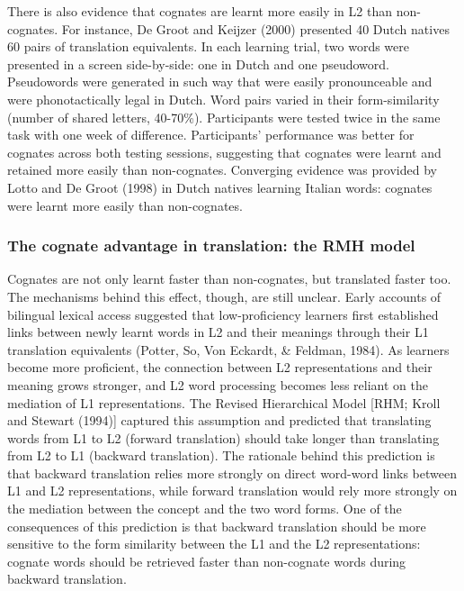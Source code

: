 \documentclass[
  english,
  man,floatsintext]{apa6}
\begin{document}
There is also evidence that cognates are learnt more easily in L2 than non-cognates. For instance, De Groot and Keijzer (2000) presented 40 Dutch natives 60 pairs of translation equivalents. In each learning trial, two words were presented in a screen side-by-side: one in Dutch and one pseudoword. Pseudowords were generated in such way that were easily pronounceable and were phonotactically legal in Dutch. Word pairs varied in their form-similarity (number of shared letters, 40-70\%). Participants were tested twice in the same task with one week of difference. Participants' performance was better for cognates across both testing sessions, suggesting that cognates were learnt and retained more easily than non-cognates. Converging evidence was provided by Lotto and De Groot (1998) in Dutch natives learning Italian words: cognates were learnt more easily than non-cognates.

\hypertarget{the-cognate-advantage-in-translation-the-rmh-model}{%
\subsubsection{The cognate advantage in translation: the RMH model}\label{the-cognate-advantage-in-translation-the-rmh-model}}

Cognates are not only learnt faster than non-cognates, but translated faster too. The mechanisms behind this effect, though, are still unclear. Early accounts of bilingual lexical access suggested that low-proficiency learners first established links between newly learnt words in L2 and their meanings through their L1 translation equivalents (Potter, So, Von Eckardt, \& Feldman, 1984). As learners become more proficient, the connection between L2 representations and their meaning grows stronger, and L2 word processing becomes less reliant on the mediation of L1 representations. The Revised Hierarchical Model {[}RHM; Kroll and Stewart (1994){]} captured this assumption and predicted that translating words from L1 to L2 (forward translation) should take longer than translating from L2 to L1 (backward translation). The rationale behind this prediction is that backward translation relies more strongly on direct word-word links between L1 and L2 representations, while forward translation would rely more strongly on the mediation between the concept and the two word forms. One of the consequences of this prediction is that backward translation should be more sensitive to the form similarity between the L1 and the L2 representations: cognate words should be retrieved faster than non-cognate words during backward translation.
\end{document}
